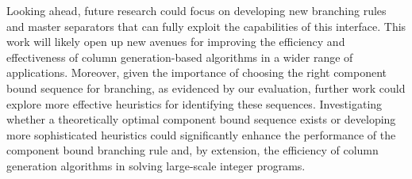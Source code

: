 Looking ahead, future research could focus on developing new branching rules and master separators that can fully exploit the capabilities of this interface. This work will likely open up new avenues for improving the efficiency and effectiveness of column generation-based algorithms in a wider range of applications. Moreover, given the importance of choosing the right component bound sequence for branching, as evidenced by our evaluation, further work could explore more effective heuristics for identifying these sequences. Investigating whether a theoretically optimal component bound sequence exists or developing more sophisticated heuristics could significantly enhance the performance of the component bound branching rule and, by extension, the efficiency of column generation algorithms in solving large-scale integer programs.
